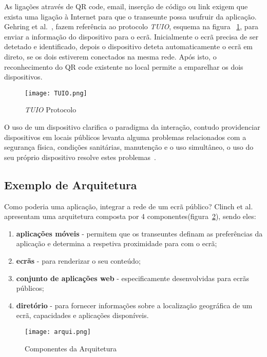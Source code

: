 As ligações através de QR code, email, inserção de código ou link exigem que exista uma ligação à Internet para que o transeunte possa usufruir da aplicação. 
Gehring et al.~\cite{Gehring}, fazem referência ao protocolo \textit{TUIO}, esquema na figura ~\ref{fig:TUIO}, para enviar a informação do dispositivo para o ecrã. Inicialmente o ecrã precisa de ser detetado e identificado, depois o dispositivo deteta automaticamente o ecrã em direto, se os dois estiverem conectados na mesma rede. Após isto, o reconhecimento do QR code existente no local permite a emparelhar os dois dispositivos.

\begin{figure}[ht]
\centering
\texttt{[image: TUIO.png]}
\caption[textit{TUIO} Protocolo] {\textit{TUIO} Protocolo ~\cite{Gehring}}
\label{fig:TUIO}
\end{figure}


O uso de um dispositivo clarifica o paradigma da interação, contudo providenciar dispositivos em locais públicos levanta alguma problemas relacionados com a segurança física, condições sanitárias, manutenção e o uso simultâneo, o uso do seu próprio dispositivo resolve estes problemas~\cite{Ballagas}.

\subsection{Exemplo de Arquitetura}

Como poderia uma aplicação, integrar a rede de um ecrã público? Clinch et al.~\cite{Clinch2012}  apresentam uma arquitetura composta por 4 componentes(figura~\ref{fig:arquitetura}), sendo eles:
\begin{enumerate}
\item \textbf{aplicações móveis} - permitem que os transeuntes definam as preferências da aplicação e determina a respetiva proximidade para com o ecrã;
\item \textbf{ecrãs} - para renderizar o seu conteúdo;
\item \textbf{conjunto de aplicações web} - especificamente desenvolvidas para ecrãs públicos;
\item \textbf{diretório} - para fornecer informações sobre a localização geográfica de um ecrã, 
capacidades e aplicações disponíveis.
\end{enumerate}

\begin{figure}[ht]
\centering
\texttt{[image: arqui.png]}
\caption[Componentes da Arquitetura] {Componentes da Arquitetura~\cite{Gehring}}
\label{fig:arquitetura}
\end{figure}


